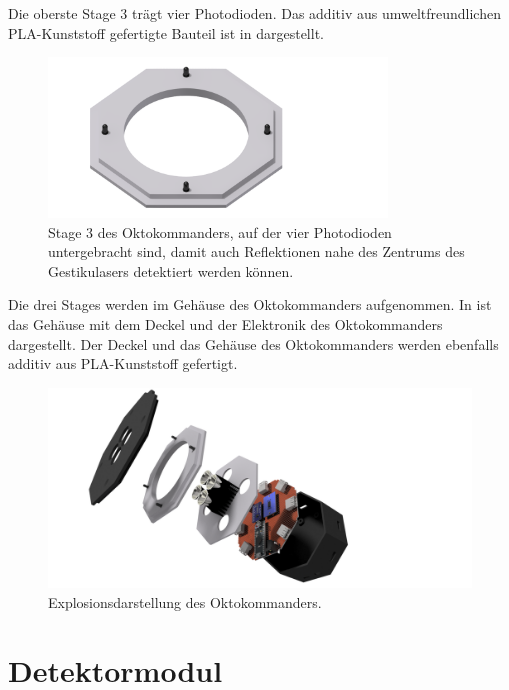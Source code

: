 \newpage
\noindent
Die oberste Stage 3 trägt vier Photodioden. Das additiv aus umweltfreundlichen PLA-Kunststoff gefertigte Bauteil ist in  dargestellt.
\begin{figure}[H]
	\centering
	\includegraphics[width=9cm]{../CAD_Bilder/OktagonElektronik_Stage3_raytraced.png}
	\caption{Stage 3 des Oktokommanders, auf der vier Photodioden untergebracht sind, damit auch Reflektionen nahe des Zentrums des Gestikulasers detektiert werden können.}
	\label{fig:OktoStage3}
\end{figure}
\noindent
Die drei Stages werden im Gehäuse des Oktokommanders aufgenommen. In  ist das Gehäuse mit dem Deckel und der Elektronik des Oktokommanders dargestellt. Der Deckel und das Gehäuse des Oktokommanders werden ebenfalls additiv aus PLA-Kunststoff gefertigt.
\begin{figure}[H]
	\centering
	\includegraphics[width=12cm]{../CAD_Bilder/Oktokommander_raytraced.png}
	\caption{Explosionsdarstellung des Oktokommanders.}
	\label{fig:OktoZusammenbau}
\end{figure}




\section{Detektormodul}
\label{sec:Detektormodul}

